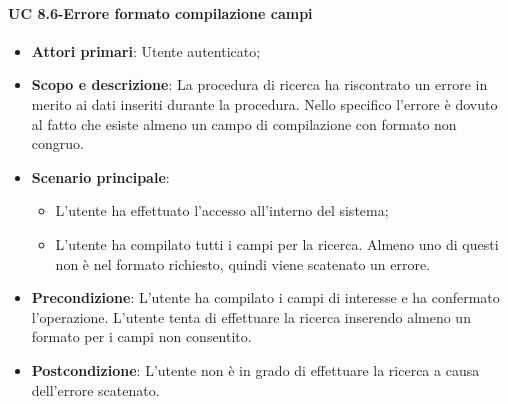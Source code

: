         \paragraph{UC 8.6-Errore formato compilazione campi}
       \begin{itemize}
        \item \textbf{Attori primari}: Utente autenticato;
        \item \textbf{Scopo e descrizione}:  La procedura di ricerca ha riscontrato un errore in merito ai dati inseriti durante la procedura. Nello specifico l'errore è dovuto al fatto che esiste almeno un campo di compilazione con formato non congruo.
        \item \textbf{Scenario principale}:
            \begin{itemize}
                \item L'utente ha effettuato l'accesso all'interno del sistema;
                \item L'utente ha compilato tutti i campi per la ricerca. Almeno uno di questi non è nel formato richiesto, quindi viene scatenato un errore.
            \end{itemize}
        \item \textbf{Precondizione}: L'utente ha compilato i campi di interesse e ha confermato l'operazione. L'utente tenta di effettuare la ricerca inserendo almeno un formato per i campi non consentito.
        \item \textbf{Postcondizione}: L'utente non è in grado di effettuare la ricerca a causa dell'errore scatenato.
        \end{itemize}
  
